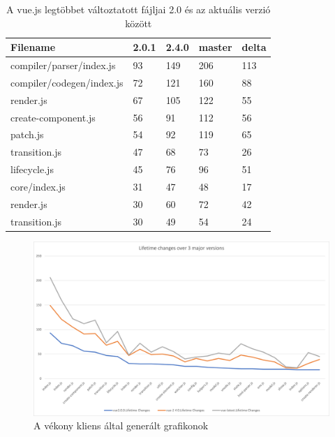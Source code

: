 \begin{table}[h]
    \centering
    \begin{tabular}{l|l|l|l|l}
        Filename                  & 2.0.1 & 2.4.0 & master & delta \\ \hline
        compiler/parser/index.js  & 93    & 149   & 206    & 113   \\
        compiler/codegen/index.js & 72    & 121   & 160    & 88    \\
        render.js                 & 67    & 105   & 122    & 55    \\
        create-component.js       & 56    & 91    & 112    & 56    \\
        patch.js                  & 54    & 92    & 119    & 65    \\
        transition.js             & 47    & 68    & 73     & 26    \\
        lifecycle.js              & 45    & 76    & 96     & 51    \\
        core/index.js             & 31    & 47    & 48     & 17    \\
        render.js                 & 30    & 60    & 72     & 42    \\
        transition.js             & 30    & 49    & 54     & 24
    \end{tabular}
    \caption{A vue.js legtöbbet változtatott fájljai 2.0 és az aktuális verzió között}
    \label{tab:vue-changes-comp}
\end{table}

\begin{figure}[H]
    \centering
    \includegraphics[width=1\textwidth]{images/vue/vue-all-lifetime-changes.png}
    \caption{A vékony kliens által generált grafikonok}
    \label{fig:hestia-charts}
\end{figure}

